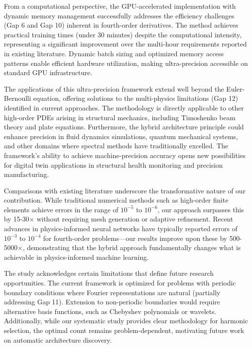 From a computational perspective, the GPU-accelerated implementation with dynamic memory management successfully addresses the efficiency challenges (Gap 6 and Gap 10) inherent in fourth-order derivatives. The method achieves practical training times (under 30 minutes) despite the computational intensity, representing a significant improvement over the multi-hour requirements reported in existing literature. Dynamic batch sizing and optimized memory access patterns enable efficient hardware utilization, making ultra-precision accessible on standard GPU infrastructure.

The applications of this ultra-precision framework extend well beyond the Euler-Bernoulli equation, offering solutions to the multi-physics limitations (Gap 12) identified in current approaches. The methodology is directly applicable to other high-order PDEs arising in structural mechanics, including Timoshenko beam theory and plate equations. Furthermore, the hybrid architecture principle could enhance precision in fluid dynamics simulations, quantum mechanical systems, and other domains where spectral methods have traditionally excelled. The framework's ability to achieve machine-precision accuracy opens new possibilities for digital twin applications in structural health monitoring and precision manufacturing.

Comparisons with existing literature underscore the transformative nature of our contribution. While traditional numerical methods such as high-order finite elements achieve errors in the range of $10^{-5}$ to $10^{-6}$, our approach surpasses this by 15-30× without requiring mesh generation or adaptive refinement. Recent advances in physics-informed neural networks \cite{raissi2019physics, karniadakis2021physics} have typically reported errors of $10^{-3}$ to $10^{-4}$ for fourth-order problems—our results improve upon these by 500-5000×, demonstrating that the hybrid approach fundamentally changes what is achievable in physics-informed machine learning.

The study acknowledges certain limitations that define future research opportunities. The current framework is optimized for problems with periodic boundary conditions where Fourier representations are natural (partially addressing Gap 11). Extension to non-periodic boundaries would require alternative basis functions, such as Chebyshev polynomials or wavelets. Additionally, while our systematic study provides clear methodology for harmonic selection, the optimal count remains problem-dependent, motivating future work on automatic architecture discovery.

